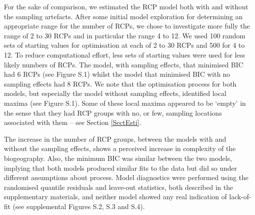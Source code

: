 \documentclass{statsoc}
\begin{document}
For the sake of comparison, we estimated the RCP model both with and without the sampling artefacts. After some initial model exploration for determining an appropriate range for the number of RCPs, we chose to investigate more fully the range of 2 to 30 RCPs and in particular the range 4 to 12. We used 100 random sets of starting values for optimisation at each of 2 to 30 RCPs and 500 for 4 to 12. To reduce computational effort, less sets of starting values were used for less likely numbers of RCPs. The model, with sampling effects, that minimised BIC had 6 RCPs (see Figure S.1) whilst the model that minimised BIC with no sampling effects had 8 RCPs. We note that the optimisation process for both models, but especially the model without sampling effects, identified local maxima (see Figure S.1). Some of these local maxima appeared to be `empty' in the sense that they had RCP groups with no, or few, sampling locations associated with them -- see Section \ref{SectEsti}. %

The increase in the number of RCP groups, between the models with and without the sampling effects,  shows a perceived increase in complexity of the biogeography. Also, the minimum BIC was similar between the two models, implying that both models produced similar fits to the data but did so under different assumptions about process. Model diagnostics were performed using the randomised quantile residuals and leave-out statistics, both described in the supplementary materials, and neither model showed any real indication of lack-of-fit (see supplemental Figures S.2, S.3 and S.4).
\end{document}
